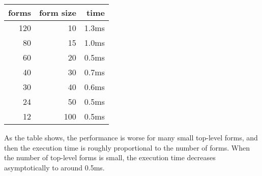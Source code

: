 \vskip 0.3cm
\begin{tabular}{|r|r|r|}
\hline
forms & form size & time\\
\hline
120 & 10 & 1.3ms\\
80 & 15  & 1.0ms\\
60 & 20  & 0.5ms\\
40 & 30  & 0.7ms\\
30 & 40  & 0.6ms\\
24 & 50  & 0.5ms\\
12 & 100 & 0.5ms\\
\hline
\end{tabular}
\vskip 0.3cm

As the table shows, the performance is worse for many small top-level
forms, and then the execution time is roughly proportional to the
number of forms.  When the number of top-level forms is small, the
execution time decreases asymptotically to around 0.5ms.
